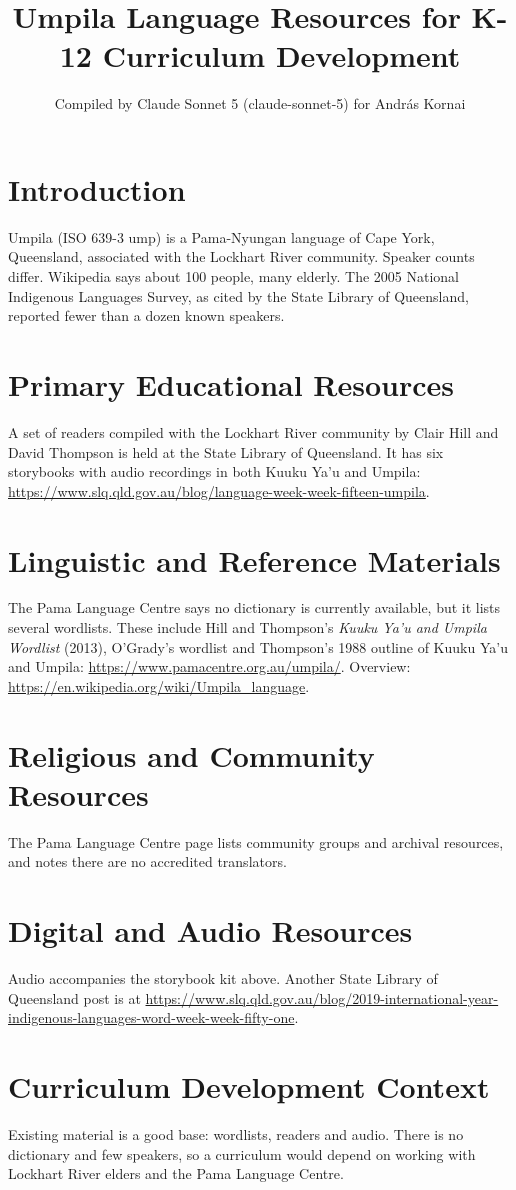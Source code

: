\documentclass[12pt]{article}
\title{Umpila Language Resources for K-12 Curriculum Development}
\author{Compiled by Claude Sonnet 5 (claude-sonnet-5) for Andr\'as Kornai}
\date{}
\begin{document}
\maketitle
\section{Introduction}
Umpila (ISO 639-3 ump) is a Pama-Nyungan language of Cape York, Queensland, associated with the Lockhart River community. Speaker counts differ. Wikipedia says about 100 people, many elderly. The 2005 National Indigenous Languages Survey, as cited by the State Library of Queensland, reported fewer than a dozen known speakers.
\section{Primary Educational Resources}
A set of readers compiled with the Lockhart River community by Clair Hill and David Thompson is held at the State Library of Queensland. It has six storybooks with audio recordings in both Kuuku Ya'u and Umpila: \url{https://www.slq.qld.gov.au/blog/language-week-week-fifteen-umpila}.
\section{Linguistic and Reference Materials}
The Pama Language Centre says no dictionary is currently available, but it lists several wordlists. These include Hill and Thompson's \emph{Kuuku Ya'u and Umpila Wordlist} (2013), O'Grady's wordlist and Thompson's 1988 outline of Kuuku Ya'u and Umpila: \url{https://www.pamacentre.org.au/umpila/}. Overview: \url{https://en.wikipedia.org/wiki/Umpila_language}.
\section{Religious and Community Resources}
The Pama Language Centre page lists community groups and archival resources, and notes there are no accredited translators.
\section{Digital and Audio Resources}
Audio accompanies the storybook kit above. Another State Library of Queensland post is at \url{https://www.slq.qld.gov.au/blog/2019-international-year-indigenous-languages-word-week-week-fifty-one}.
\section{Curriculum Development Context}
Existing material is a good base: wordlists, readers and audio. There is no dictionary and few speakers, so a curriculum would depend on working with Lockhart River elders and the Pama Language Centre.
\end{document}

